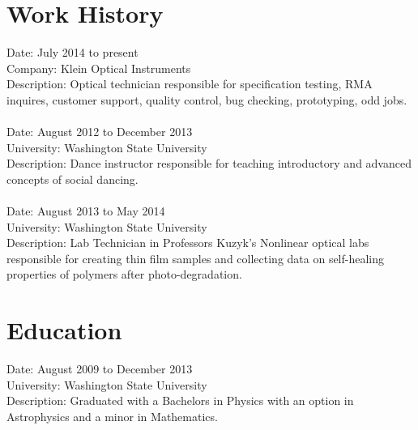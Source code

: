 \documentclass[8pt]{article}
\begin{document}
\section{Work History}

Date: July 2014 to present\\
Company: Klein Optical Instruments\\
Description: Optical technician responsible for specification testing, RMA inquires, customer support, quality control, bug checking, prototyping, odd jobs.
\\
\\
Date: August 2012 to December 2013\\
University: Washington State University\\
Description: Dance instructor responsible for teaching introductory and advanced concepts of social dancing.
\\
\\
Date: August 2013 to May 2014\\
University: Washington State University\\
Description: Lab Technician in Professors Kuzyk's Nonlinear optical labs responsible for creating thin film samples and collecting data on self-healing properties of polymers after photo-degradation.

\section{Education}

Date: August 2009 to December 2013\\
University: Washington State University\\
Description: Graduated with a Bachelors in Physics with an option in Astrophysics and a minor in Mathematics.
\end{document}
